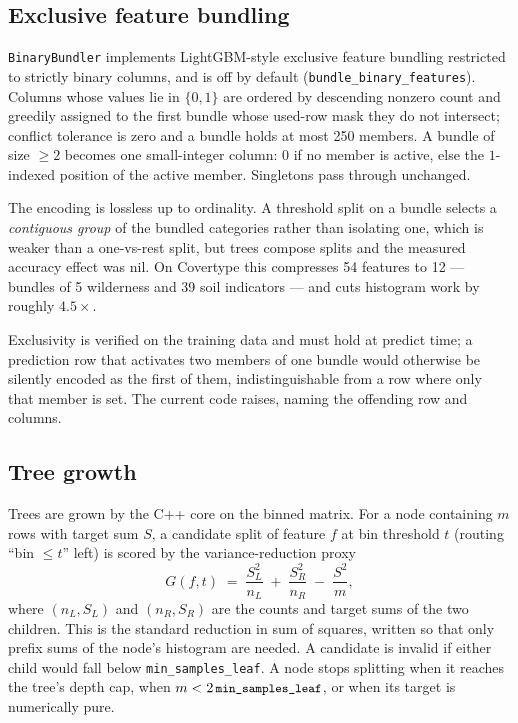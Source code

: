 \documentclass[11pt,a4paper]{article}
\newcommand{\code}[1]{\texttt{\small #1}}
\theoremstyle{definition}
\begin{document}
\subsection{Exclusive feature bundling}\label{sec:efb}

\code{BinaryBundler} implements LightGBM-style exclusive feature bundling
\cite{ke2017lightgbm} restricted to strictly binary columns, and is off by
default (\code{bundle\_binary\_features}). Columns whose values lie in
$\{0,1\}$ are ordered by descending nonzero count and greedily assigned to the
first bundle whose used-row mask they do not intersect; conflict tolerance is
zero and a bundle holds at most 250 members. A bundle of size $\ge 2$ becomes
one small-integer column: $0$ if no member is active, else the $1$-indexed
position of the active member. Singletons pass through unchanged.

The encoding is lossless up to ordinality. A threshold split on a bundle
selects a \emph{contiguous group} of the bundled categories rather than
isolating one, which is weaker than a one-vs-rest split, but trees compose
splits and the measured accuracy effect was nil. On Covertype this compresses
54 features to 12 --- bundles of 5 wilderness and 39 soil indicators --- and
cuts histogram work by roughly $4.5\times$.

Exclusivity is verified on the training data and must hold at predict time; a
prediction row that activates two members of one bundle would otherwise be
silently encoded as the first of them, indistinguishable from a row where only
that member is set. The current code raises, naming the offending row and
columns.

\subsection{Tree growth}\label{sec:growth}

Trees are grown by the C++ core on the binned matrix. For a node containing
$m$ rows with target sum $S$, a candidate split of feature $f$ at bin threshold
$t$ (routing ``bin $\le t$'' left) is scored by the variance-reduction proxy
\begin{equation}\label{eq:gain}
G(f,t) \;=\; \frac{S_L^2}{n_L} \;+\; \frac{S_R^2}{n_R} \;-\; \frac{S^2}{m},
\end{equation}
where $(n_L, S_L)$ and $(n_R, S_R)$ are the counts and target sums of the two
children. This is the standard reduction in sum of squares, written so that
only prefix sums of the node's histogram are needed. A candidate is invalid if
either child would fall below \code{min\_samples\_leaf}. A node stops splitting
when it reaches the tree's depth cap, when $m < 2\,\code{min\_samples\_leaf}$,
or when its target is numerically pure.
\end{document}
